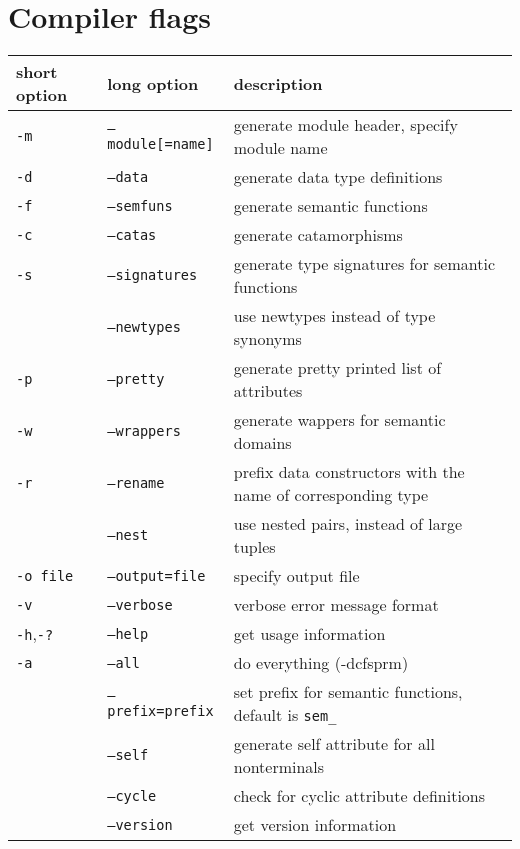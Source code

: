 \documentclass{article}
\newcommand{\option}[1]{\texttt{#1}}
\newcommand{\Sec}[1]{\section{#1}}
\begin{document}
{\Sec{Compiler flags}\label{flags}
\begin{tabular}{l|l|l}
  short option& long option              & description\\
  \hline
  \option{-m}               & \option{--module[=name]} & generate module header, specify module name\\
  \option{-d}               & \option{--data}          & generate data type definitions \\
  \option{-f}               & \option{--semfuns}       & generate semantic functions \\
  \option{-c}               & \option{--catas}         & generate catamorphisms \\
  \option{-s}               & \option{--signatures}    & generate type signatures for semantic functions\\
                            & \option{--newtypes}      & use newtypes instead of type synonyms\\
  \option{-p}               & \option{--pretty}        & generate pretty printed list of attributes\\
  \option{-w}               & \option{--wrappers}      & generate wappers for semantic domains\\
  \option{-r}               & \option{--rename}        & prefix data constructors with the name of corresponding type\\
                            & \option{--nest}          & use nested pairs, instead of large tuples\\
  \option{-o file}          & \option{--output=file}   & specify output file\\
  \option{-v}               & \option{--verbose}       & verbose error message format\\
  \option{-h},\option{-?}   & \option{--help}          & get usage information\\
  \option{-a}               & \option{--all}           & do everything (-dcfsprm)\\
                            & \option{--prefix=prefix} & set prefix for semantic functions, default is \verb+sem_+\\
                            & \option{--self}          & generate self attribute for all nonterminals\\
                            & \option{--cycle}         & check for cyclic attribute definitions\\
                            & \option{--version}       & get version information\\
\end{tabular}

}
\end{document}

